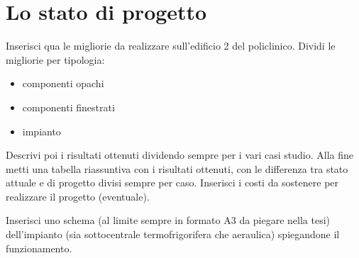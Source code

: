 \chapter{Lo stato di progetto}
\thispagestyle{empty}
Inserisci qua le migliorie da realizzare sull'edificio 2 del policlinico. Dividi le migliorie per tipologia:
\begin{itemize}
	\item componenti opachi
	\item componenti finestrati
	\item impianto
\end{itemize}
Descrivi poi i risultati ottenuti dividendo sempre per i vari casi studio. Alla fine metti una tabella riassuntiva con i risultati ottenuti, con le differenza tra stato attuale e di progetto divisi sempre per caso. Inserisci i costi da sostenere per realizzare il progetto (eventuale).

Inserisci uno schema (al limite sempre in formato A3 da piegare nella tesi) dell'impianto (sia sottocentrale termofrigorifera che aeraulica) spiegandone il funzionamento.